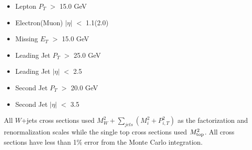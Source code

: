 \begin{itemize}
\item Lepton $P_{T}$ $>$ 15.0 GeV
\item Electron(Muon) $|\eta|$ $<$ 1.1(2.0)
\item Missing $E_{T}$ $>$ 15.0 GeV
\item Leading Jet $P_{T}$ $>$ 25.0 GeV
\item Leading Jet $|\eta|$ $<$ 2.5
\item Second Jet $P_{T}$ $>$ 20.0 GeV
\item Second Jet $|\eta|$ $<$ 3.5
\end{itemize}

All $W$+jets cross sections used $M_{W}^{2} + \sum_{jets}({M_{i}^2 + P_{i,T}^2})$ as
the factorization and renormalization scales while the single top cross sections
used $M_{\rm{top}}^{2}$. All cross sections have less than 1$\%$ error from the
Monte Carlo integration.

